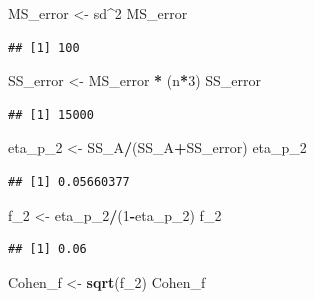 \documentclass[]{book}
\newenvironment{Shaded}{\begin{snugshade}}{\end{snugshade}}
\newcommand{\DecValTok}[1]{\textcolor[rgb]{0.00,0.00,0.81}{#1}}
\newcommand{\KeywordTok}[1]{\textcolor[rgb]{0.13,0.29,0.53}{\textbf{#1}}}
\newcommand{\NormalTok}[1]{#1}
\newcommand{\OperatorTok}[1]{\textcolor[rgb]{0.81,0.36,0.00}{\textbf{#1}}}
\newcommand{\StringTok}[1]{\textcolor[rgb]{0.31,0.60,0.02}{#1}}
\begin{document}
\begin{Shaded}
\begin{Highlighting}[]
\NormalTok{MS_error <-}\StringTok{ }\NormalTok{sd}\OperatorTok{^}\DecValTok{2}
\NormalTok{MS_error}
\end{Highlighting}
\end{Shaded}

\begin{verbatim}
## [1] 100
\end{verbatim}

\begin{Shaded}
\begin{Highlighting}[]
\NormalTok{SS_error <-}\StringTok{ }\NormalTok{MS_error }\OperatorTok{*}\StringTok{ }\NormalTok{(n}\OperatorTok{*}\DecValTok{3}\NormalTok{) }
\NormalTok{SS_error}
\end{Highlighting}
\end{Shaded}

\begin{verbatim}
## [1] 15000
\end{verbatim}

\begin{Shaded}
\begin{Highlighting}[]
\NormalTok{eta_p_}\DecValTok{2}\NormalTok{ <-}\StringTok{ }\NormalTok{SS_A}\OperatorTok{/}\NormalTok{(SS_A}\OperatorTok{+}\NormalTok{SS_error)}
\NormalTok{eta_p_}\DecValTok{2}
\end{Highlighting}
\end{Shaded}

\begin{verbatim}
## [1] 0.05660377
\end{verbatim}

\begin{Shaded}
\begin{Highlighting}[]
\NormalTok{f_}\DecValTok{2}\NormalTok{ <-}\StringTok{ }\NormalTok{eta_p_}\DecValTok{2}\OperatorTok{/}\NormalTok{(}\DecValTok{1}\OperatorTok{-}\NormalTok{eta_p_}\DecValTok{2}\NormalTok{)}
\NormalTok{f_}\DecValTok{2}
\end{Highlighting}
\end{Shaded}

\begin{verbatim}
## [1] 0.06
\end{verbatim}

\begin{Shaded}
\begin{Highlighting}[]
\NormalTok{Cohen_f <-}\StringTok{ }\KeywordTok{sqrt}\NormalTok{(f_}\DecValTok{2}\NormalTok{)}
\NormalTok{Cohen_f}
\end{Highlighting}
\end{Shaded}
\end{document}
